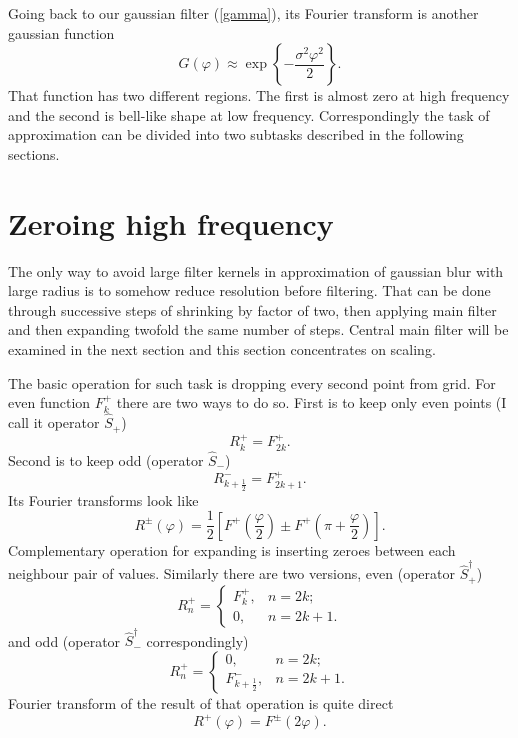 \documentclass[10pt]{article}
\begin{document}
Going back to our gaussian filter (\ref{gamma}), its Fourier transform is another gaussian function
\begin{equation}\label{gauss}
    G(\varphi) \approx \exp\left\{-\frac{\sigma^2\varphi^2}2\right\}.
\end{equation}
That function has two different regions. The first is almost zero at high frequency and the second
is bell-like shape at low frequency. Correspondingly the task of approximation can be divided into
two subtasks described in the following sections.


\section{Zeroing high frequency}

The only way to avoid large filter kernels in approximation of gaussian blur with large radius is to
somehow reduce resolution before filtering. That can be done through successive steps of shrinking by
factor of two, then applying main filter and then expanding twofold the same number of steps.
Central main filter will be examined in the next section and this section concentrates on scaling.

The basic operation for such task is dropping every second point from grid. For even function
$F^+_k$ there are two ways to do so. First is to keep only even points (I call it operator
$\hat S_+$)
\begin{equation}
    R^+_k = F^+_{2k}.
\end{equation}
Second is to keep odd (operator $\hat S_-$)
\begin{equation}
    R^-_{k+\frac12} = F^+_{2k+1}.
\end{equation}
Its Fourier transforms look like
\begin{equation}\label{S}
    R^\pm(\varphi) =
        \frac12 \left[F^+\left(\frac\varphi2\right) \pm F^+\left(\pi+\frac\varphi2\right)\right].
\end{equation}
Complementary operation for expanding is inserting zeroes between each neighbour pair of values.
Similarly there are two versions, even (operator $\hat S^\dagger_+$)
\begin{equation}
    R^+_n = \left\{
        \begin{array}{ll}
            F^+_k,& n = 2k;\\
            0,& n = 2k + 1.
        \end{array}
    \right.
\end{equation}
and odd (operator $\hat S^\dagger_-$ correspondingly)
\begin{equation}
    R^+_n = \left\{
        \begin{array}{ll}
            0,& n = 2k;\\
            F^-_{k+\frac12},& n = 2k + 1.
        \end{array}
    \right.
\end{equation}
Fourier transform of the result of that operation is quite direct
\begin{equation}
    R^+(\varphi) = F^\pm(2\varphi).
\end{equation}
\end{document}
